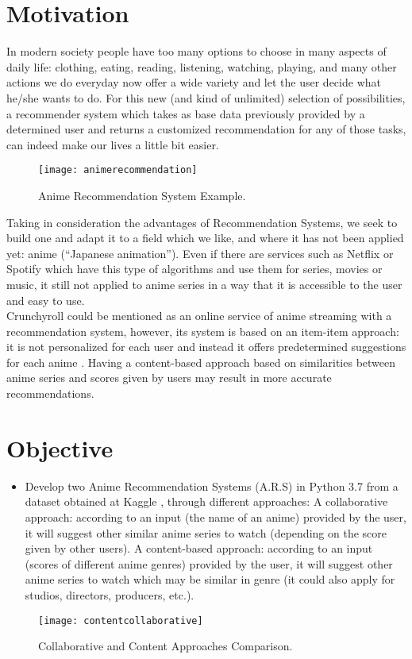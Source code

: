 \documentclass[conference]{IEEEtran}
\begin{document}
\section{Motivation}
In modern society people have too many options to choose in many aspects of daily life: clothing, eating, reading, listening, watching, playing, and many other actions we do everyday now offer a wide variety and let the user decide what he/she wants to do. For this new (and kind of unlimited) selection of possibilities, a recommender system which takes as base data previously provided by a determined user and returns a customized recommendation for any of those tasks, can indeed make our lives a little bit easier.
\begin{figure}[H]
	\centering
	\texttt{[image: animerecommendation]}
	\caption{Anime Recommendation System Example.}
	\label{2}
\end{figure}

Taking in consideration the advantages of Recommendation Systems, we seek to build one and adapt it to a field which we like, and where it has not been applied yet: anime (“Japanese animation”). Even if there are services such as Netflix or Spotify which have this type of algorithms and use them for series, movies or music, it still not applied to anime series in a way that it is accessible to the user and easy to use.
\\
Crunchyroll could be mentioned as an online service of anime streaming with a recommendation system, however, its system is based on an item-item approach: it is not personalized for each user and instead it offers predetermined suggestions for each anime \cite{b6}. Having a content-based approach based on similarities between anime series and scores given by users may result in more accurate recommendations.

\section{Objective}
\begin{itemize}
	\item Develop two Anime Recommendation Systems (A.R.S) in Python 3.7 from a dataset obtained at Kaggle \cite{b7}, through different approaches:
	\SubItem A collaborative approach: according to an input (the name of an anime) provided by the user, it will suggest other similar anime series to watch (depending on the score given by other users).
	\SubItem A content-based approach: according to an input (scores of different anime genres) provided by the user, it will suggest other anime series to watch which may be similar in genre (it could also apply for studios, directors, producers, etc.).
\end{itemize}
\begin{figure}[H]
	\centering
	\texttt{[image: contentcollaborative]}
	\caption{Collaborative and Content Approaches Comparison.}
	\label{3}
\end{figure}
\end{document}
